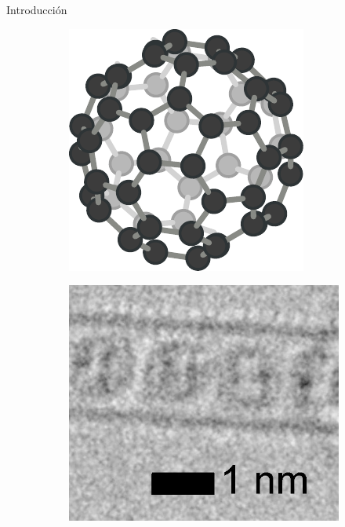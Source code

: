 \documentclass{beamer}
\begin{document}
\begin{frame}{Introducción}
\begin{figure}
\begin{subfigure}[b]{0.2\textwidth}
				\includegraphics[width=\textwidth]{fullerene_structure.pdf}
				\caption{}
				\label{fig:fullerene_structure}
			\end{subfigure}
			\begin{subfigure}[b]{0.2\textwidth}
				\includegraphics[width=\textwidth]{fullerene_image.jpg}

\end{subfigure}
\end{figure}
\end{frame}
\end{document}
